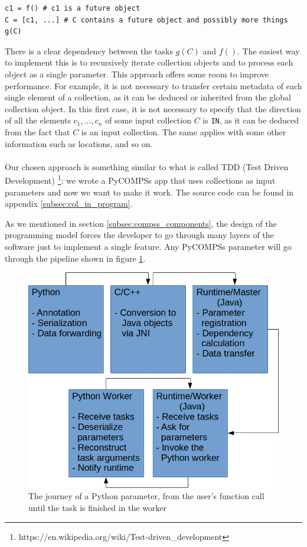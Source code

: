 \begin{verbatim}
c1 = f() # c1 is a future object
C = [c1, ...] # C contains a future object and possibly more things
g(C)
\end{verbatim}
There is a clear dependency between the tasks $g(C)$ and $f()$. The easiest way to implement this is to recursively iterate collection objects and to process each object as a single parameter. This approach offers some room to improve performance. For example, it is not necessary to transfer certain metadata of each single element of a collection, as it can be deduced or inherited from the global collection object. In this first case, it is not necessary to specify that the direction of all the elements $c_1, ..., c_n$ of some input collection $C$ is \verb|IN|, as it can be deduced from the fact that $C$ is an input collection. The same applies with some other information such as locations, and so on.\\
\\
Our chosen approach is something similar to what is called TDD (Test Driven Development) \footnote{https://en.wikipedia.org/wiki/Test-driven\_development}: we wrote a PyCOMPSs app that uses collections as input parameters and now we want to make it work. The source code can be found in appendix \ref{subsec:col_in_program}.

As we mentioned in section \ref{subsec:compss_components}, the design of the programming model forces the developer to go through many layers of the software just to implement a single feature. Any PyCOMPSs parameter will go through the pipeline shown in figure \ref{fig:parameter_pipeline}.

\begin{figure}[ht!]
\centering
\includegraphics[scale = 0.5]{figures/parameter_pipeline.png}
\caption{The journey of a Python parameter, from the user's function call until the task is finished in the worker}
\label{fig:parameter_pipeline}
\end{figure}

